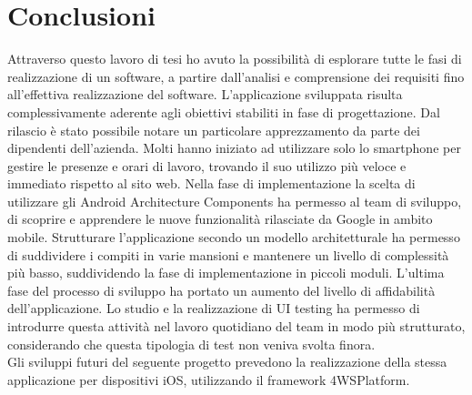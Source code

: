 \documentclass[12pt]{report}
\begin{document}
\chapter{Conclusioni}
Attraverso questo lavoro di tesi ho avuto la possibilità di esplorare tutte le fasi di realizzazione di un software, a partire dall'analisi e comprensione dei requisiti fino all’effettiva realizzazione del software. L'applicazione sviluppata risulta complessivamente aderente agli obiettivi stabiliti
in fase di progettazione. Dal rilascio è stato possibile notare un particolare apprezzamento da parte dei dipendenti dell'azienda. Molti hanno iniziato ad utilizzare solo lo smartphone per gestire le presenze e orari di lavoro, trovando il suo utilizzo più veloce e immediato rispetto al sito web. 
Nella fase di implementazione la scelta di utilizzare gli Android Architecture Components ha permesso al team di sviluppo, di scoprire e apprendere le nuove funzionalità rilasciate da Google in ambito mobile. Strutturare l'applicazione secondo un modello architetturale ha permesso di suddividere i compiti in varie mansioni e mantenere un livello di complessità più basso, suddividendo la fase di implementazione in piccoli moduli. L'ultima fase del processo di sviluppo ha portato un aumento del livello di affidabilità dell'applicazione. Lo studio e la realizzazione di UI testing ha permesso di introdurre questa attività nel lavoro quotidiano del team in modo più strutturato, considerando che questa tipologia di test non veniva svolta finora. 
\\Gli sviluppi futuri del seguente progetto prevedono la realizzazione della stessa applicazione per dispositivi iOS, utilizzando il framework 4WSPlatform.
  
  
\end{document}
